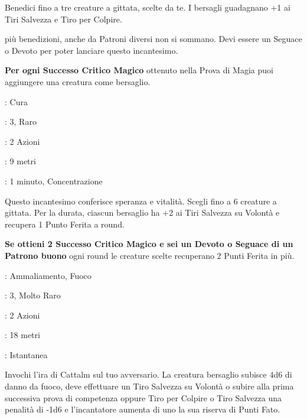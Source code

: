 \begin{multicols}{2}
Benedici fino a tre creature a gittata, scelte da te. I bersagli guadagnano +1 ai Tiri Salvezza e Tiro per Colpire.

più benedizioni, anche da Patroni diversi non si sommano. Devi essere un Seguace o Devoto per poter lanciare questo incantesimo.

\textbf{Per ogni Successo Critico Magico} ottenuto nella Prova di Magia puoi aggiungere una creatura come bersaglio.

\noindent\colorbox{OBSSgold!10}{
\begin{minipage}{0.95\linewidth}
\begin{description}[noitemsep, topsep=0pt, parsep=0pt, partopsep=0pt, leftmargin=0cm, labelwidth=1.3cm]
	\item[\textbf{Lista}]: Cura
	\item[\textbf{Livello}]: 3, Raro
	\item[\textbf{Lancio}]: 2 Azioni
	\item[\textbf{Gittata}]: 9 metri
	\item[\textbf{Durata}]: 1 minuto, Concentrazione
\end{description}
\end{minipage}}\smallskip

Questo incantesimo conferisce speranza e vitalità. Scegli fino a 6 creature a gittata. Per la durata, ciascun bersaglio ha +2 ai Tiri Salvezza su Volontà e recupera 1 Punto Ferita a round.

\textbf{Se ottieni 2 Successo Critico Magico e sei un Devoto o Seguace di un Patrono buono} ogni round le creature scelte recuperano 2 Punti Ferita in più.

\noindent\colorbox{OBSSgold!10}{
\begin{minipage}{0.95\linewidth}
\begin{description}[noitemsep, topsep=0pt, parsep=0pt, partopsep=0pt, leftmargin=0cm, labelwidth=1.3cm]
	\item[\textbf{Lista}]: Ammaliamento, Fuoco
	\item[\textbf{Livello}]: 3, Molto Raro
	\item[\textbf{Lancio}]: 2 Azioni
	\item[\textbf{Gittata}]: 18 metri
	\item[\textbf{Durata}]: Istantanea
\end{description}
\end{minipage}}\smallskip

Invochi l'ira di Cattalm sul tuo avversario. La creatura bersaglio subisce 4d6 di danno da fuoco, deve effettuare un Tiro Salvezza su Volontà o subire alla prima successiva prova di competenza oppure Tiro per Colpire o Tiro Salvezza una penalità di -1d6 e l'incantatore aumenta di uno la sua riserva di Punti Fato.


\end{multicols}
